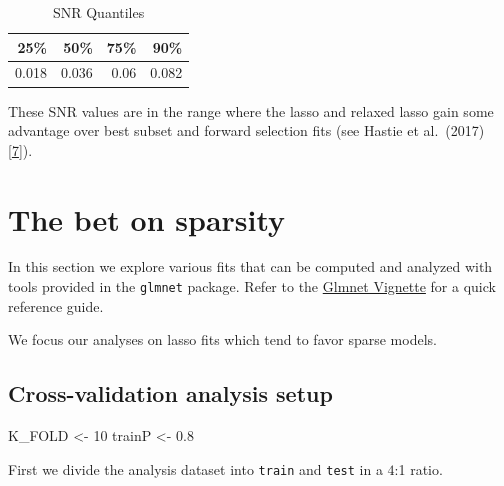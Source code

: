 \documentclass[
]{book}
\newenvironment{Shaded}{\begin{snugshade}}{\end{snugshade}}
\newcommand{\DecValTok}[1]{\textcolor[rgb]{0.00,0.00,0.81}{#1}}
\newcommand{\FloatTok}[1]{\textcolor[rgb]{0.00,0.00,0.81}{#1}}
\newcommand{\NormalTok}[1]{#1}
\newcommand{\StringTok}[1]{\textcolor[rgb]{0.31,0.60,0.02}{#1}}
\begin{document}
\begin{table}

\caption{\label{tab:plotSNR}SNR Quantiles}
\centering
\begin{tabular}[t]{r|r|r|r}
\hline
25\% & 50\% & 75\% & 90\%\\
\hline
0.018 & 0.036 & 0.06 & 0.082\\
\hline
\end{tabular}
\end{table}

These SNR values are in the range where the lasso and relaxed lasso gain some advantage over
best subset and forward selection fits (see Hastie et al.~(2017) {[}\protect\hyperlink{ref-Hastie:2017aa}{7}{]}).

\hypertarget{explore-sparsity}{%
\chapter{The bet on sparsity}\label{explore-sparsity}}

In this section we explore various fits that can be computed
and analyzed with tools provided in the \texttt{glmnet} package.
Refer to the \href{https://web.stanford.edu/~hastie/glmnet/glmnet_alpha.html}{Glmnet Vignette}
for a quick reference guide.

We focus our analyses on lasso fits which tend to favor sparse models.

\hypertarget{cross-validation-analysis-setup}{%
\section{Cross-validation analysis setup}\label{cross-validation-analysis-setup}}

\begin{Shaded}
\begin{Highlighting}[]
\NormalTok{K\_FOLD <{-}}\StringTok{ }\DecValTok{10}
\NormalTok{trainP <{-}}\StringTok{ }\FloatTok{0.8}
\end{Highlighting}
\end{Shaded}

First we divide the analysis dataset into \texttt{train} and \texttt{test} in a \(4\):1 ratio.
\end{document}
